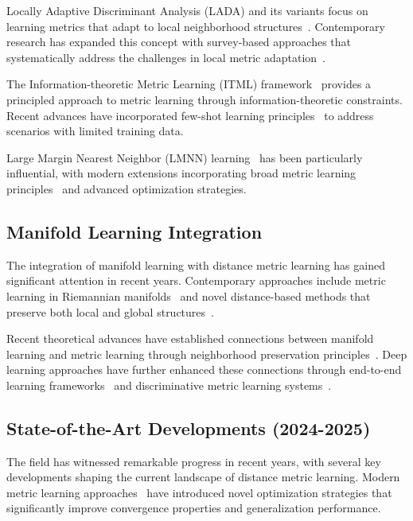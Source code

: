 \documentclass[review]{elsarticle}
\begin{document}
Locally Adaptive Discriminant Analysis (LADA) and its variants focus on learning metrics that adapt to local neighborhood structures~\cite{domeniconi2002locally}. Contemporary research has expanded this concept with survey-based approaches that systematically address the challenges in local metric adaptation~\cite{kertesz2025survey}.

The Information-theoretic Metric Learning (ITML) framework~\cite{yang2006efficient} provides a principled approach to metric learning through information-theoretic constraints. Recent advances have incorporated few-shot learning principles~\cite{shang2024few} to address scenarios with limited training data.

Large Margin Nearest Neighbor (LMNN) learning~\cite{weinberger2008fast} has been particularly influential, with modern extensions incorporating broad metric learning principles~\cite{hu2025broad} and advanced optimization strategies.

\subsection{Manifold Learning Integration}

The integration of manifold learning with distance metric learning has gained significant attention in recent years. Contemporary approaches include metric learning in Riemannian manifolds~\cite{gruffaz2025riemannian} and novel distance-based methods that preserve both local and global structures~\cite{bs2025distance}.

Recent theoretical advances have established connections between manifold learning and metric learning through neighborhood preservation principles~\cite{weinberger2009distance,goldberger2005neighbourhood}. Deep learning approaches have further enhanced these connections through end-to-end learning frameworks~\cite{xu2025deep} and discriminative metric learning systems~\cite{duan2025discriminative}.

\subsection{State-of-the-Art Developments (2024-2025)}

The field has witnessed remarkable progress in recent years, with several key developments shaping the current landscape of distance metric learning. Modern metric learning approaches~\cite{kokkonen2025metric} have introduced novel optimization strategies that significantly improve convergence properties and generalization performance.
\end{document}
